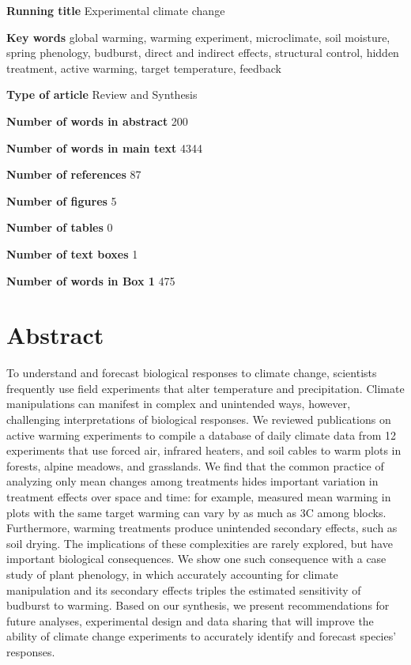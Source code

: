 \documentclass{article}
\begin{document}
\textbf{Running title} Experimental climate change

\textbf{Key words} global warming, warming experiment, microclimate, soil moisture, spring phenology, budburst, direct and indirect effects, structural control, hidden treatment, active warming, target temperature, feedback

\textbf{Type of article} Review and Synthesis

\textbf{Number of words in abstract} 200

\textbf{Number of words in main text} 4344%

\textbf{Number of references} 87

\textbf{Number of figures} 5

\textbf{Number of tables} 0

\textbf{Number of text boxes} 1

\textbf{Number of words in Box 1} 475

\clearpage

\clearpage
\linenumbers



\section*{Abstract}
\par To understand and forecast biological responses to climate change, scientists frequently use field experiments that alter temperature and precipitation. Climate manipulations can manifest in complex and unintended ways, however, challenging interpretations of biological responses. We reviewed publications on active warming experiments to compile a database of daily climate data from 12 experiments that use forced air, infrared heaters, and soil cables to warm plots in forests, alpine meadows, and grasslands. We find that the common practice of analyzing only mean changes among treatments hides important variation in treatment effects over space and time: for example, measured mean warming in plots with the same target warming can vary by as much as 3\degree C among blocks.
 Furthermore, warming treatments produce unintended secondary effects, such as soil drying. The implications of these complexities are rarely explored, but have important biological consequences. We show one such consequence with a case study of plant phenology, in which accurately accounting for climate manipulation and its secondary effects triples the estimated sensitivity of budburst to warming. Based on our synthesis, we present recommendations for future analyses, experimental design and data sharing that will improve the ability of climate change experiments to accurately identify and forecast species' responses.
\end{document}
